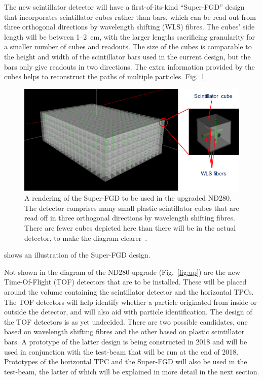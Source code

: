 \documentclass[aps,pra,12pt,notitlepage,tightenlines]{revtex4-1}
\begin{document}
The new scintillator detector will have a first-of-its-kind ``Super-FGD'' design that incorporates scintillator cubes rather than bars, which can be read out from three orthogonal directions by wavelength shifting (WLS) fibres. The cubes' side length will be between 1--2~cm, with the larger lengths sacrificing granularity for a smaller number of cubes and readouts. The size of the cubes is comparable to the height and width of the scintillator bars used in the current design, but the bars only give readouts in two directions. The extra information provided by the cubes helps to reconstruct the paths of multiple particles. Fig.~\ref{fig:sfgd}
 \begin{figure}
  \includegraphics[scale=0.75]{SFGD.png}
  \caption{A rendering of the Super-FGD to be used in the upgraded ND280. The detector comprises many small plastic scintillator cubes that are read off in three orthogonal directions by wavelength shifting fibres. There are fewer cubes depicted here than there will be in the actual detector, to make the diagram clearer~\cite{Blondel:2299599}.}
  \label{fig:sfgd}
 \end{figure}
shows an illustration of the Super-FGD design.

Not shown in the diagram of the ND280 upgrade (Fig.\ \ref{fig:up}) are the new Time-Of-Flight (TOF) detectors that are to be installed. These will be placed around the volume containing the scintillator detector and the horizontal TPCs. The TOF detectors will help identify whether a particle originated from inside or outside the detector, and will also aid with particle identification. The design of the TOF detectors is as yet undecided. There are two possible candidates, one based on wavelength shifting fibres and the other based on plastic scintillator bars. A prototype of the latter design is being constructed in 2018 and will be used in conjunction with the test-beam that will be run at the end of 2018. Prototypes of the horizontal TPC and the Super-FGD will also be used in the test-beam, the latter of which will be explained in more detail in the next section.
\end{document}
